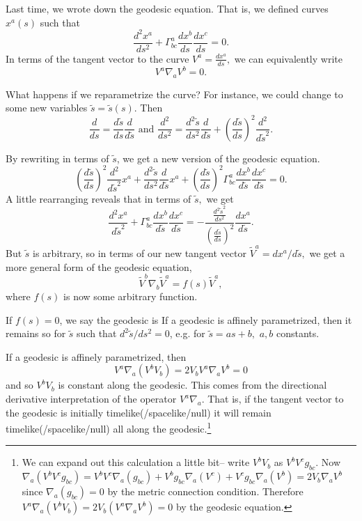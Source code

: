Last time, we wrote down the geodesic equation. That is, we defined curves $x^a(s)$ such that
$$\frac{d^2x^a}{ds^2}+\Gamma^a_{bc}\frac{dx^b}{ds}\frac{dx^c}{ds}=0.$$
In terms of the tangent vector to the curve $V^a = \frac{dx^a}{ds},$
we can equivalently write
$$V^a\nabla_a V^b=0.$$

What happens if we reparametrize the curve? For instance, we could change to some new variables $\tilde s=\tilde s(s).$
Then $$\frac{d}{ds}=\frac{d\tilde s}{ds} \frac{d}{d\tilde s}\text{ and }\frac{d^2}{ds^2}=\frac{d^2 \tilde s}{ds^2}\frac{d}{d\tilde s} + \left(\frac{d\tilde s}{ds}\right)^2\frac{d^2}{d\tilde s^2}.$$

By rewriting in terms of $\tilde s$, we get a new version of the geodesic equation.
$$\left(\frac{d\tilde s}{ds}\right)^2 \frac{d^2}{d\tilde s^2} x^a+ \frac{d^2\tilde s}{ds^2} \frac{d}{d\tilde s} x^a + \left(\frac{d\tilde s}{ds}\right)^2 \Gamma^a_{bc} \frac{dx^b}{d\tilde s}\frac{dx^c}{d\tilde s}=0.$$
A little rearranging reveals that in terms of $\tilde s,$ we get
$$\frac{d^2x^a}{d\tilde s^2}+\Gamma^a_{bc} \frac{dx^b}{d\tilde s} \frac{dx^c}{d\tilde s}=-\frac{\frac{d^2\tilde s^2}{d s^2}}{\left(\frac{d\tilde s}{d s}\right)^2} \frac{dx^a}{d\tilde s}.$$
But $\tilde s$ is arbitrary, so in terms of our new tangent vector $\tilde V^a=dx^a/d\tilde s,$ we get a more general form of the geodesic equation,
$$\tilde V^b \nabla_b \tilde V^a=f(s)\tilde V^a,$$
where $f(s)$ is now some arbitrary function.
\begin{defn}
If $f(s)=0$, we say the geodesic is  If a geodesic is affinely parametrized, then it remains so for $\tilde s$ such that $d^2\tilde s/ds^2=0$, e.g. for $\tilde s= as+b,$ $a,b$ constants.
\end{defn}

If a geodesic is affinely parametrized, then
$$V^a \nabla_a (V^b V_b)=2V_b V^a \nabla _a V^b=0$$ and so $V^b V_b$ is constant along the geodesic. This comes from the directional derivative interpretation of the operator $V^a \nabla_a$. That is, if the tangent vector to the geodesic is initially timelike(/spacelike/null) it will remain timelike(/spacelike/null) all along the geodesic.\footnote{We can expand out this calculation a little bit-- write $V^b V_b$ as $V^b V^c g_{bc}$. Now $\nabla_a(V^b V^c g_{bc})=V^b V^c\nabla_a( g_{bc})+V^b g_{bc} \nabla_a (V^c) + V^c g_{bc} \nabla_a (V^b)= 2 V_b \nabla_a V^b$ since $\nabla_a (g_{bc})=0$ by the metric connection condition. Therefore $V^a \nabla_a (V^b V_b)= 2V_b (V^a \nabla_a V^b) = 0$ by the geodesic equation.}

